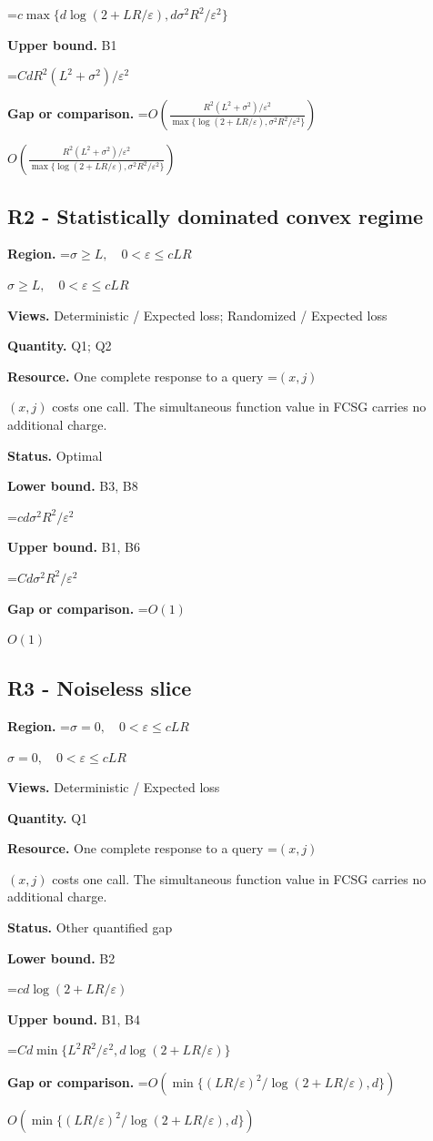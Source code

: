 \documentclass[10pt,a4paper]{article}
\newcommand{\AtlasMath}[1]{\par\begingroup\centering\setbox0=\hbox{$\displaystyle #1$}\ifdim\wd0>1.4\linewidth\typeout{ATLAS WIDE FORMULA: \the\wd0}\fi\ifdim\wd0>\linewidth\resizebox{\linewidth}{!}{\box0}\else\box0\fi\par\endgroup}
\newcommand{\AtlasInlineMath}[1]{\begingroup\setbox0=\hbox{$#1$}\ifdim\wd0>.4\linewidth\endgroup\AtlasMath{#1}\else\endgroup$#1$\fi}
\begin{document}
\AtlasMath{c\max\{d\log(2+LR/\varepsilon),d\sigma^2R^2/\varepsilon^2\}}
\textbf{Upper bound.} B1

\AtlasMath{CdR^2(L^2+\sigma^2)/\varepsilon^2}
\textbf{Gap or comparison.} \AtlasInlineMath{O\!\left(\frac{R^2(L^2+\sigma^2)/\varepsilon^2}{\max\{\log(2+LR/\varepsilon),\sigma^2R^2/\varepsilon^2\}}\right)}

\subsection{R2 - Statistically dominated convex regime}
\textbf{Region.} \AtlasInlineMath{\sigma\ge L,\quad0<\varepsilon\le cLR}

\textbf{Views.} Deterministic / Expected loss; Randomized / Expected loss

\textbf{Quantity.} Q1; Q2

\textbf{Resource.} One complete response to a query \AtlasInlineMath{(x,j)} costs one call. The simultaneous function value in FCSG carries no additional charge.

\textbf{Status.} Optimal

\textbf{Lower bound.} B3, B8

\AtlasMath{cd\sigma^2R^2/\varepsilon^2}
\textbf{Upper bound.} B1, B6

\AtlasMath{Cd\sigma^2R^2/\varepsilon^2}
\textbf{Gap or comparison.} \AtlasInlineMath{O(1)}

\subsection{R3 - Noiseless slice}
\textbf{Region.} \AtlasInlineMath{\sigma=0,\quad0<\varepsilon\le cLR}

\textbf{Views.} Deterministic / Expected loss

\textbf{Quantity.} Q1

\textbf{Resource.} One complete response to a query \AtlasInlineMath{(x,j)} costs one call. The simultaneous function value in FCSG carries no additional charge.

\textbf{Status.} Other quantified gap

\textbf{Lower bound.} B2

\AtlasMath{cd\log(2+LR/\varepsilon)}
\textbf{Upper bound.} B1, B4

\AtlasMath{Cd\min\{L^2R^2/\varepsilon^2,d\log(2+LR/\varepsilon)\}}
\textbf{Gap or comparison.} \AtlasInlineMath{O\!\left(\min\{(LR/\varepsilon)^2/\log(2+LR/\varepsilon),d\}\right)}
\end{document}
